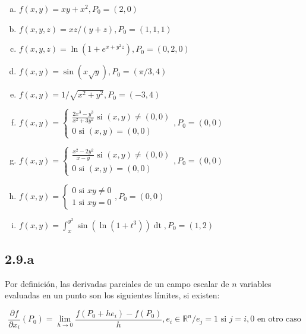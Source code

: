 \documentclass{article}
\renewcommand{\Bbb}{\mathbb}
\begin{document}
\begin{enumerate}[(a)]
\bfseries

\item $f(x,y) = xy + x^2, P_0 = (2, 0)$

\item $f(x,y,z) = xz / (y+z), P_0 = (1, 1, 1)$

\item $f(x, y, z) = \ln(1 + e^{x+y^2 z}), P_0 = (0, 2, 0)$

\item $f(x,y) = \sin(x \sqrt{y}), P_0 = (\pi/3, 4)$

\item $f(x,y) = 1/\sqrt{x^2 + y^2}, P_0 = (-3, 4)$

\item $f(x,y) = \left\{ \begin{array}{ll}
\frac{2x^3 - y^3}{x^2 + 3y^2} \text{ si } (x,y) \neq (0,0) \\
0 \text{ si } (x,y) = (0,0)
\end{array} \right., P_0 = (0,0)$

\item $f(x,y) = \left\{ \begin{array}{ll}
\frac{x^2 - 2y^2}{x - y} \text{ si } (x,y) \neq (0,0) \\
0 \text{ si } (x,y) = (0,0)
\end{array} \right., P_0 = (0,0)$ 

\item $f(x,y) = \left\{ \begin{array}{ll}
0 \text{ si } xy \neq 0 \\
1 \text{ si } xy = 0
\end{array} \right., P_0 = (0,0)$

\item $f(x,y) = \int_{x}^{y^2} \sin(\ln(1 + t^3)) \mathop{dt}, P_0 = (1,2)$

\end{enumerate}

\subsection*{2.9.a}
\label{subsec:2.9.a}

Por definición, las derivadas parciales de un campo escalar de $n$ variables evaluadas en un punto son los siguientes límites, si existen:

\begin{equation}
\frac{\partial f}{\partial x_i}(P_0) = \lim_{h \rightarrow 0} \frac{f(P_0 + h e_i) - f(P_0)}{h}, e_i \in \Bbb R^n / e_j = 1 \text{ si } j = i, 0 \text{ en otro caso} 
\end{equation}
\end{document}
